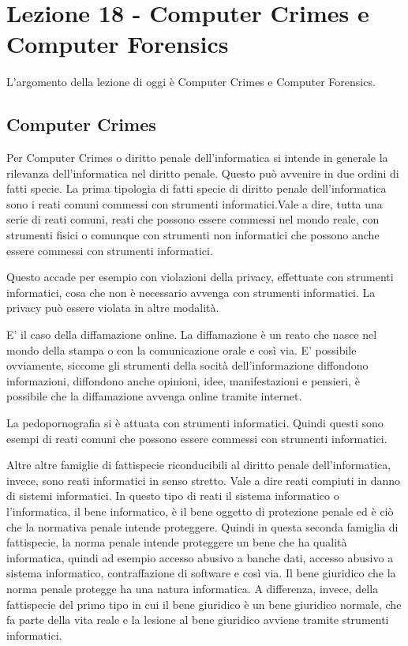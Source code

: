 \chapter{Lezione 18 - Computer Crimes e Computer Forensics}

L'argomento della lezione di oggi è Computer Crimes e Computer Forensics.

\section{Computer Crimes}
Per Computer Crimes o diritto penale dell'informatica si intende in generale la rilevanza dell'informatica nel diritto penale. Questo può avvenire in due ordini di fatti specie. La prima tipologia di fatti specie di diritto penale dell'informatica sono i reati comuni commessi con strumenti informatici.Vale a dire, tutta una serie di reati comuni, reati che possono essere commessi nel mondo reale, con strumenti fisici o comunque con strumenti non informatici che  possono anche essere commessi con strumenti informatici. 

Questo accade per esempio con violazioni della privacy, effettuate con strumenti informatici, cosa che non è necessario avvenga con strumenti informatici. La privacy può essere violata in altre modalità. 

E' il caso della diffamazione online. La diffamazione è un reato che nasce nel mondo della stampa o con la comunicazione orale e così via. E' possibile ovviamente, siccome gli strumenti della socità dell'informazione diffondono informazioni, diffondono anche opinioni, idee, manifestazioni e pensieri, è possibile che la diffamazione avvenga online tramite internet.

La pedopornografia si è attuata con strumenti informatici. 
Quindi questi sono esempi di reati comuni che possono essere commessi con strumenti informatici. 

Altre altre famiglie di fattispecie riconducibili al diritto penale dell'informatica, invece, sono reati informatici in senso stretto. Vale a dire reati compiuti in danno di sistemi informatici. In questo tipo di reati il sistema informatico o l'informatica, il bene informatico, è il bene oggetto di protezione penale ed è ciò che la normativa penale intende proteggere.
Quindi in questa seconda famiglia di fattispecie, la norma penale intende proteggere un bene che ha qualità informatica, quindi ad esempio accesso abusivo a banche dati, accesso abusivo a sistema informatico, contraffazione di software e così via. Il bene giuridico che la norma penale protegge ha una natura informatica. A differenza, invece, della fattispecie del primo tipo in cui il bene giuridico è un bene giuridico normale, che fa parte della vita reale e la lesione al bene giuridico avviene tramite strumenti informatici. 

